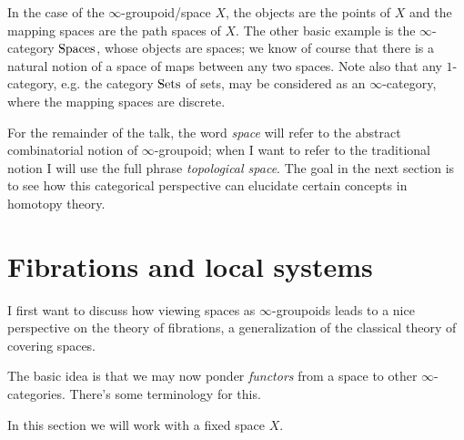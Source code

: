 \begin{philosophy}
\begin{subremark}
    In the case of the $\infty$-groupoid/space $X$, the objects are the points of $X$ and the mapping spaces are the path spaces of $X$. The other basic example is the $\infty$-category $\mathrm{Spaces}$, whose objects are spaces; we know of course that there is a natural notion of a space of maps between any two spaces. Note also that any $1$-category, e.g. the category $\mathrm{Sets}$ of sets, may be considered as an $\infty$-category, where the mapping spaces are discrete.
  \end{subremark}

  \begin{convention}
    \label{gpd-hyp-perspective}
    For the remainder of the talk, the word \emph{space} will refer to the abstract combinatorial notion of $\infty$-groupoid; when I want to refer to the traditional notion I will use the full phrase \emph{topological space}. The goal in the next section is to see how this categorical perspective can elucidate certain concepts in homotopy theory.
  \end{convention}
\end{philosophy}


\section{Fibrations and local systems}
\label{fib}

I first want to discuss how viewing spaces as $\infty$-groupoids leads to a nice perspective on the theory of fibrations, a generalization of the classical theory of covering spaces.

The basic idea is that we may now ponder \emph{functors} from a space to other $\infty$-categories. There's some terminology for this.

\begin{notation}
  \label{fib-fix}
  In this section we will work with a fixed space $X$.
\end{notation}


